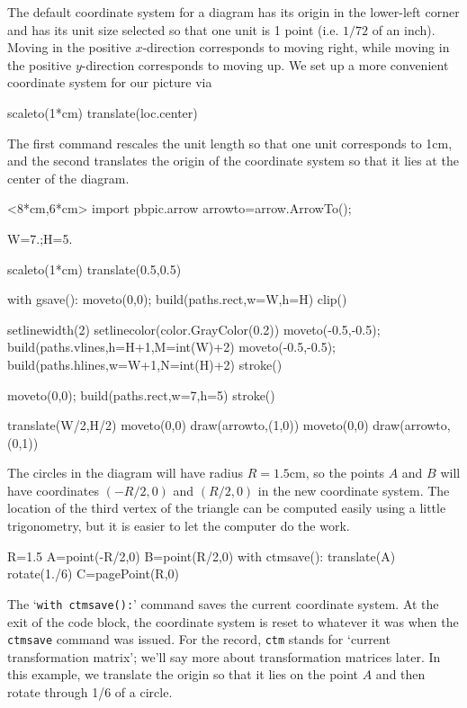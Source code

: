 \documentclass[12pt]{article}
\def\code#1{{\tt #1}}
\begin{document}
The default coordinate system for a diagram has its origin
in the lower-left corner and has its unit size selected
so that one unit is 1 point (i.e. $1/72$ of an inch).
Moving
in the positive $x$-direction corresponds to moving right, while moving
in the positive $y$-direction corresponds to moving up.  We set up
a more convenient coordinate system for our picture via
\begin{snippet}
scaleto(1*cm)
translate(loc.center)
\end{snippet}
The first command rescales the unit length so that one unit corresponds to 
1cm, and the second translates the origin of the coordinate system 
so that it lies at the center of the diagram.

\hfil\begin{pbpic}<8*cm,6*cm>
import pbpic.arrow
arrowto=arrow.ArrowTo();

W=7.;H=5.

scaleto(1*cm)
translate(0.5,0.5)

with gsave():
  moveto(0,0); build(paths.rect,w=W,h=H)
  clip()
  
  setlinewidth(2)
  setlinecolor(color.GrayColor(0.2))
  moveto(-0.5,-0.5); build(paths.vlines,h=H+1,M=int(W)+2)
  moveto(-0.5,-0.5); build(paths.hlines,w=W+1,N=int(H)+2)
  stroke()

moveto(0,0); build(paths.rect,w=7,h=5)
stroke()

translate(W/2,H/2)
moveto(0,0)
draw(arrowto,(1,0))
moveto(0,0)
draw(arrowto,(0,1))
\end{pbpic}

The circles in the diagram will have radius $R=1.5$cm, so the
points $A$ and $B$ will have coordinates $(-R/2,0)$ and $(R/2,0)$
in the new coordinate system. The location of the third vertex
of the triangle can be computed easily using a little trigonometry,
but it is easier to let the computer do the work.
\begin{snippet}
R=1.5
A=point(-R/2,0)
B=point(R/2,0)
with ctmsave():
  translate(A)
  rotate(1./6)
  C=pagePoint(R,0)
\end{snippet}
The `\code{with ctmsave():}' command saves the current coordinate system.
At the exit of the code block, the coordinate system is reset to whatever
it was when the \code{ctmsave} command was issued.  For the record, \code{ctm}
stands for `current transformation matrix'; we'll say more about transformation matrices
later.  In this example, we translate the origin so that it lies on the
point $A$ and then rotate through 1/6 of a circle. 
\end{document}
